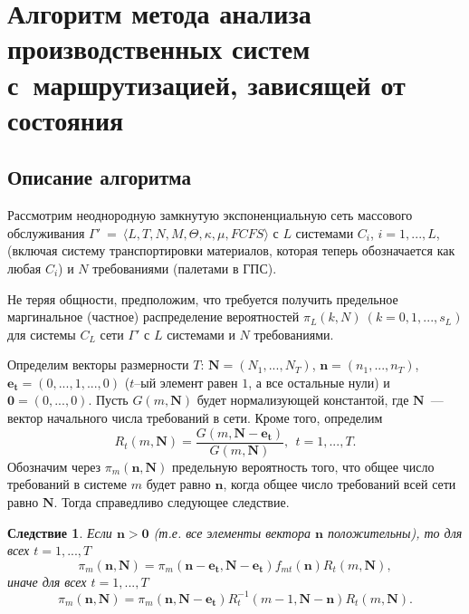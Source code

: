 \documentclass[a4paper,14pt]{extarticle}
\theoremstyle{note}
\newtheorem{corollary}{Следствие}
\begin{document}
\section{Алгоритм метода анализа производственных систем с~маршрутизацией, зависящей от состояния}
\label{sec:algorithm}

\subsection{Описание алгоритма}
\label{subsec:algorithm_description}

Рассмотрим неоднородную замкнутую экспоненциальную сеть массового обслуживания $\Gamma'~=~\langle L, T, N, M, \Theta, \kappa, \mu, FCFS \rangle$ с $L$ системами $C_i$, $i=1,...,L$, (включая систему транспортировки материалов, которая теперь обозначается как любая $C_i$) и $N$ требованиями (палетами в ГПС).

Не теряя общности, предположим, что требуется получить предельное маргинальное (частное) распределение вероятностей $\pi_L(k,N)~(k=0,1,...,s_L)$ для системы $C_L$ сети $\Gamma'$ с $L$ системами и $N$ требованиями.

Определим векторы размерности $T$: $\mathbf{N}=(N_1,...,N_T)$, $\mathbf{n}=(n_1,...,n_T)$, $\mathbf{e_t}=(0,...,1,...,0)$ ($t$--ый элемент равен $1$, а все остальные нули) и $\mathbf{0}=(0,...,0)$. Пусть $G(m,\mathbf{N})$ будет нормализующей константой, где $\mathbf{N}$~--- вектор начального числа требований в сети. Кроме того, определим
\begin{equation*}
R_t(m,\mathbf{N}) = \frac{G(m,\mathbf{N}-\mathbf{e_t})}{G(m,\mathbf{N})},~~t=1,...,T.
\end{equation*}
Обозначим через $\pi_m(\mathbf{n},\mathbf{N})$ предельную вероятность того, что общее число требований в системе $m$ будет равно $\mathbf{n}$, когда общее число требований всей сети равно $\mathbf{N}$. Тогда справедливо следующее следствие.

\begin{corollary}
 Если $\mathbf{n} > \mathbf{0}$ (т.е. все элементы вектора $\mathbf{n}$ положительны), то для всех $t=1,...,T$
 \begin{equation}
  \pi_m(\mathbf{n},\mathbf{N}) = \pi_m(\mathbf{n}-\mathbf{e_t},\mathbf{N}-\mathbf{e_t})
  f_{mt}(\mathbf{n}) R_t(m,\mathbf{N}) ,
  \label{eq:10}
 \end{equation}
 иначе для всех $t=1,...,T$
  \begin{equation}
  \pi_m(\mathbf{n},\mathbf{N}) = \pi_m(\mathbf{n},\mathbf{N}-\mathbf{e_t}) R_t^{-1}(m-1,\mathbf{N}-\mathbf{n}) R_t(m,\mathbf{N}) .
  \label{eq:11}
 \end{equation}
\end{corollary}
\end{document}
